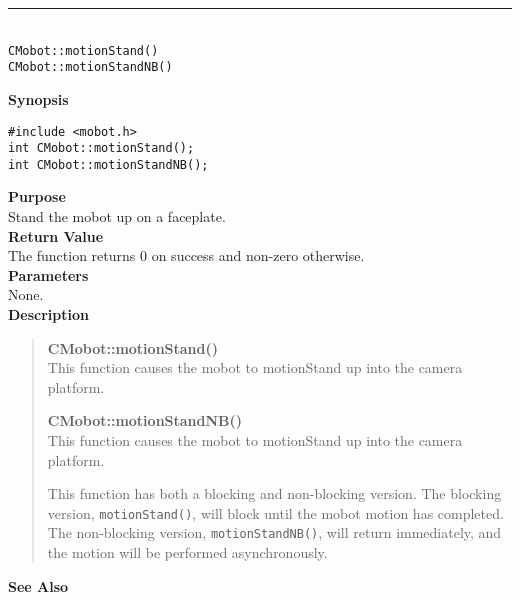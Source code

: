 \noindent
\vspace{5pt}
\rule{4.5in}{0.015in}\\
\noindent
{\LARGE \texttt{CMobot::motionStand()}}\\
{\LARGE \texttt{CMobot::motionStandNB()}}\\
{}

\noindent
{\bf Synopsis}
\vspace{-8pt}
\begin{verbatim}
#include <mobot.h>
int CMobot::motionStand();
int CMobot::motionStandNB();
\end{verbatim}

\noindent
{\bf Purpose}\\
Stand the mobot up on a faceplate.\\

\noindent
{\bf Return Value}\\
The function returns 0 on success and non-zero otherwise.\\

\noindent
{\bf Parameters}\\
None.\\

\noindent
{\bf Description}\\
\vspace{-12pt}
\begin{quote}
{\bf CMobot::motionStand()}\\
This function causes the mobot to motionStand up into the camera platform.

{\bf CMobot::motionStandNB()}\\
This function causes the mobot to motionStand up into the camera platform.

This function has both a blocking and non-blocking version.
The blocking version, \texttt{motionStand()}, will block until the
mobot motion has completed. The non-blocking version, \texttt{motionStandNB()},
will return immediately, and the motion will be performed asynchronously.\\
\end{quote}

\noindent
{\bf See Also}\\

